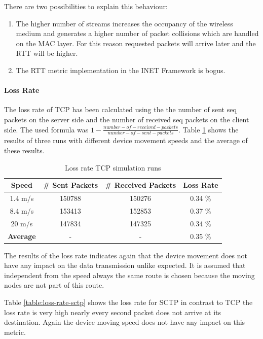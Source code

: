 \documentclass[a4paper]{article}
\begin{document}
There are two possibilities to explain this behaviour:
\begin{enumerate}
	\item The higher number of streams increases the occupancy of the wireless medium and generates a higher number of packet collisions which are handled on the MAC layer. For this reason requested packets will arrive later and the RTT will be higher.
	\item The RTT metric implementation in the INET Framework is bogus.
\end{enumerate}

\paragraph{Loss Rate}

The loss rate of TCP has been calculated using the the number of sent seq packets on the server side and the number of received seq packets on the client side. The used formula was $1 - \frac{number-of-received-packets}{number-of-sent-packets}$.
Table \ref{table:loss-rate-tcp} shows the results of three runs with different device movement speeds and the average of these results.
\begin{table}[H]
\centering
\begin{tabular}{cccc}

\textbf{Speed} & \textbf{\# Sent Packets} & \textbf{\# Received Packets} & \textbf{Loss Rate} \\ 
\hline 
\hline
1.4 m/s & 150788 & 150276 & 0.34 \% \\ 

8.4 m/s & 153413 & 152853 & 0.37 \% \\ 

20 m/s & 147834 & 147325 & 0.34 \% \\ 
 \hline
\textbf{Average} & - & - & 0.35 \% \\ 
\end{tabular} 
\caption{Loss rate TCP simulation runs}
\label{table:loss-rate-tcp}
\end{table}

The results of the loss rate indicates again that the device movement does not have any impact on the data transmission unlike expected. It is assumed that independent from the speed always the same route is chosen because the moving nodes are not part of this route.
\pagebreak

Table \ref{table:loss-rate-sctp} shows the loss rate for SCTP in contrast to TCP the loss rate is very high nearly every second packet does not arrive at its destination. Again the device moving speed does not have any impact on this metric.
\end{document}
